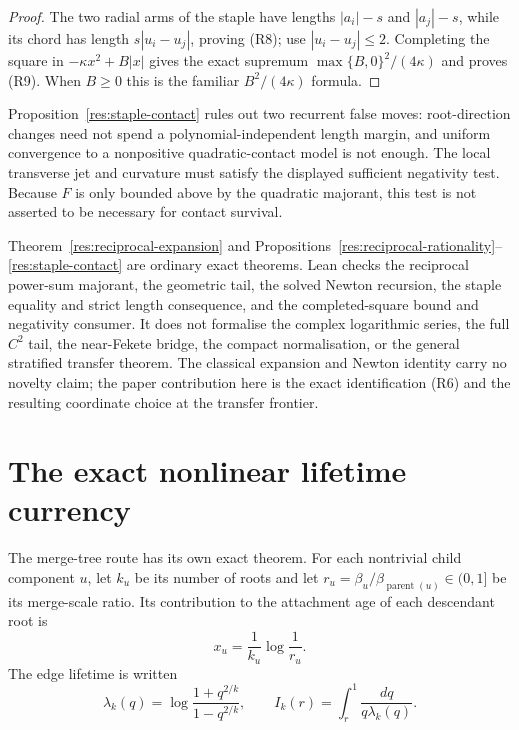 \begin{proof}
The two radial arms of the staple have lengths $|a_i|-s$ and $|a_j|-s$,
while its chord has length $s|u_i-u_j|$, proving (R8); use
$|u_i-u_j|\le2$.  Completing the square in
$-\kappa x^2+B|x|$ gives the exact supremum
$\max\{B,0\}^2/(4\kappa)$ and proves (R9).  When $B\ge0$ this is the familiar
$B^2/(4\kappa)$ formula.
\end{proof}

Proposition~\ref{res:staple-contact} rules out two recurrent false moves:
root-direction changes need not spend a polynomial-independent length margin,
and uniform convergence to a nonpositive quadratic-contact model is not
enough.  The local transverse jet and curvature must satisfy the displayed
sufficient negativity test.  Because $F$ is only bounded above by the
quadratic majorant, this test is not asserted to be necessary for contact
survival.

Theorem~\ref{res:reciprocal-expansion} and
Propositions~\ref{res:reciprocal-rationality}--\ref{res:staple-contact} are
ordinary exact theorems.  Lean checks the reciprocal power-sum majorant, the
geometric tail, the solved Newton recursion, the staple equality and strict
length consequence, and the completed-square bound and negativity consumer.
It does not formalise the complex logarithmic series, the full $C^2$ tail,
the near-Fekete bridge, the compact normalisation, or the general stratified
transfer theorem.  The classical expansion and Newton identity carry no
novelty claim; the paper contribution here is the exact identification (R6)
and the resulting coordinate choice at the transfer frontier.



\section{The exact nonlinear lifetime currency}
\label{sec:orlicz}

The merge-tree route has its own exact theorem.  For each nontrivial child
component $u$, let $k_u$ be its number of roots and let
$r_u=\beta_u/\beta_{\operatorname{parent}(u)}\in(0,1]$ be its merge-scale
ratio.  Its contribution to the attachment age of each descendant root is
\[
 x_u=\frac1{k_u}\log\frac1{r_u}.
\]
The edge lifetime is written
\[
 \lambda_k(q)=\log\frac{1+q^{2/k}}{1-q^{2/k}},
 \qquad
 I_k(r)=\int_r^1\frac{dq}{q\lambda_k(q)}.
\]

